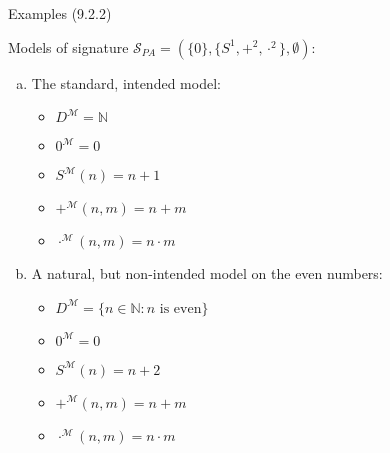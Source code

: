 \begin{frame}{Examples (9.2.2)}

Models of signature $\mathcal{S}_{PA}=(\{0\}, \{S^1, +^2, \cdot^2\}, \emptyset)$:
				
				\begin{enumerate}[(a)]
				
					\item The standard, intended model:
					
						\begin{itemize}
					
							\item $D^\mathcal{M}=\mathbb{N}$
							
							\item $0^\mathcal{M}=0$
					
							\item $S^\mathcal{M}(n)=n+1$
							
							\item $+^\mathcal{M}(n,m)=n+m$
							
							\item $\cdot^\mathcal{M}(n,m)=n\cdot m$
					
						\end{itemize}
						
					\item A natural, but non-intended model on the even numbers:
					
						\begin{itemize}
					
							\item $D^\mathcal{M}=\{n\in\mathbb{N}:n\text{ is even}\}$
																					\item $0^\mathcal{M}=0$
					
							\item $S^\mathcal{M}(n)=n+2$
							
							\item $+^\mathcal{M}(n,m)=n+m$
							
							\item $\cdot^\mathcal{M}(n,m)=n\cdot m$
					
						\end{itemize}
\end{enumerate}

\end{frame}


